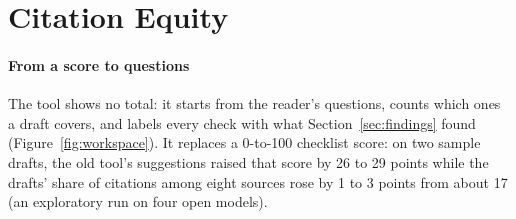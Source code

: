 
\section{Citation Equity}\label{sec:system}

\paragraph{From a score to questions}
The tool shows no total: it starts from the reader's questions, counts which ones a draft covers, and labels every check with what Section~\ref{sec:findings} found (Figure~\ref{fig:workspace}).
It replaces a 0-to-100 checklist score: on two sample drafts, the old tool's suggestions raised that score by 26 to 29 points while the drafts' share of citations among eight sources rose by 1 to 3 points from about 17 (an exploratory run on four open models).


